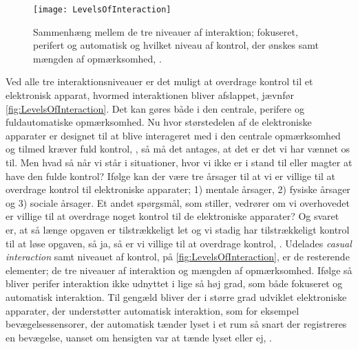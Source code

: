 %
\begin{figure}[H]
	\centering
	\texttt{[image: LevelsOfInteraction]}
	\caption{Sammenhæng mellem de tre niveauer af interaktion; fokuseret, perifert og automatisk og hvilket niveau af kontrol, der ønskes samt mængden af opmærksomhed,  \parencite[s. 118]{PDF:PeripheralInteraction}.}
	\label{fig:LevelsOfInteraction}
\end{figure}
\noindent
%
Ved alle tre interaktionsniveauer er det muligt at overdrage kontrol til et elektronisk apparat, hvormed interaktionen bliver afslappet, jævnfør \autoref{fig:LevelsOfInteraction}. Det kan gøres både i den centrale, perifere og fuldautomatiske opmærksomhed. Nu hvor størstedelen af de elektroniske apparater er designet til at blive interageret med i den centrale opmærksomhed og tilmed kræver fuld kontrol, \parencite[s. 118]{PDF:PeripheralInteraction}, så må det antages, at det er det vi har vænnet os til. Men hvad så når vi står i situationer, hvor vi ikke er i stand til eller magter at have den fulde kontrol? Ifølge \textcite[s. 123]{PDF:PeripheralInteraction} kan der være tre årsager til at vi er villige til at overdrage kontrol til elektroniske apparater; 1) mentale årsager, 2) fysiske årsager og 3) sociale årsager. Et andet spørgsmål, som \textcite[s. 124]{PDF:PeripheralInteraction} stiller, vedrører om vi overhovedet er villige til at overdrage noget kontrol til de elektroniske apparater? Og svaret er, at så længe opgaven er tilstrækkeligt let og vi stadig har tilstrækkeligt kontrol til at løse opgaven, så ja, så er vi villige til at overdrage kontrol, \parencite[s. 124]{PDF:PeripheralInteraction}.\blankline
%
Udelades \textit{casual interaction} samt niveauet af kontrol, på \autoref{fig:LevelsOfInteraction}, er de resterende elementer; de tre niveauer af interaktion og mængden af opmærksomhed. Ifølge \textcite[s. 6]{PDF:PeripheralInteraction} så bliver perifer interaktion ikke udnyttet i lige så høj grad, som både fokuseret og automatisk interaktion. Til gengæld bliver der i større grad udviklet elektroniske apparater, der understøtter automatisk interaktion, som for eksempel bevægelsessensorer, der automatisk tænder lyset i et rum så snart der registreres en bevægelse, uanset om hensigten var at tænde lyset eller ej, \parencite[s. 5]{PDF:PeripheralInteraction}. 

